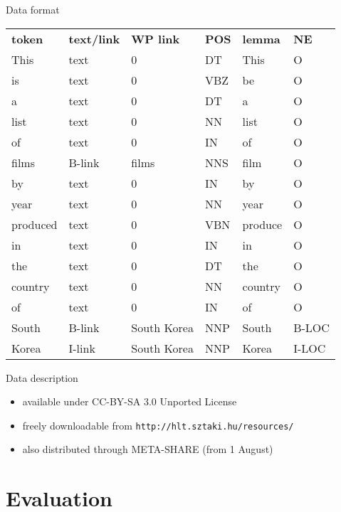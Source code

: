 \documentclass[utf8x]{beamer}
\begin{document}
\begin{frame}{Data format}

\begin{tabular}{llllll}
\textbf{token} & \textbf{text/link} & \textbf{WP link} & \textbf{POS} & \textbf{lemma} & \textbf{NE} \\
This & text & 0 &    DT &   This & O \\
is &   text & 0 &    VBZ &  be &   O \\
a &    text & 0 &    DT &   a  &    O\\
list & text & 0 &    NN &   list  & O\\
of &   text & 0 &    IN &   of &     O\\
films  & B-link & films &  NNS &  film & O\\
by &   text & 0 &    IN &   by &     O\\
year & text & 0 &    NN &   year & O\\
produced & text & 0 &    VBN &  produce & O\\
in &   text & 0 &    IN &   in &     O\\
the &  text & 0 &    DT &   the &   O\\
country &text & 0 &    NN &   country &O\\
of &   text & 0 &    IN &   of &     O\\
South &  B-link & South Korea &  NNP &  South  &B-LOC\\
Korea &  I-link & South Korea &  NNP &  Korea   & I-LOC\\
\end{tabular}

\end{frame}

\begin{frame}{Data description}

\begin{itemize}
\item available under CC-BY-SA 3.0 Unported License
\item freely downloadable from {\tt http://hlt.sztaki.hu/resources/} 
\item also distributed through META-SHARE (from 1 August)
\end{itemize}

\end{frame}

\section{Evaluation}
\end{document}

